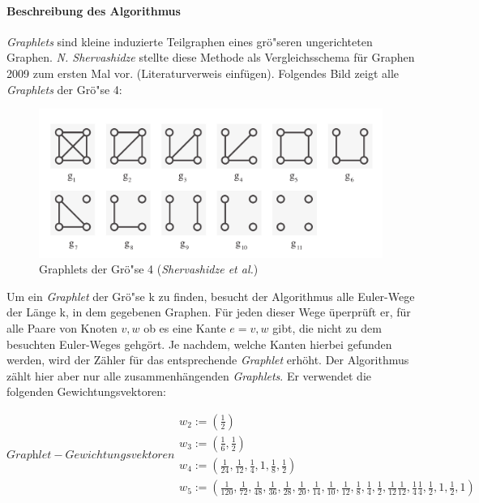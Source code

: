 \documentclass{report}
\begin{document}
\paragraph{Beschreibung des Algorithmus}
\textit{Graphlets} sind kleine induzierte Teilgraphen eines gr\"o"seren ungerichteten Graphen. \textit{N. Shervashidze} stellte diese Methode als Vergleichsschema f\"ur Graphen 2009 zum ersten Mal vor.  (Literaturverweis einf\"ugen). Folgendes Bild zeigt alle \textit{Graphlets} der Gr\"o"se 4:

\begin{figure}[h]
\includegraphics[width =\linewidth]{4graphlets.pdf}
\caption{Graphlets der Gr\"o"se 4 (\textit{Shervashidze et al.})}
\label{fig:4graphlets}
\end{figure}


Um ein \textit{Graphlet} der Gr\"o"se k zu finden, besucht der Algorithmus alle Euler-Wege der L\"ange k, in dem gegebenen Graphen. F\"ur jeden dieser Wege \"uperpr\"uft er, f\"ur alle Paare von Knoten $v,w$ ob es eine Kante $e = {v,w}$ gibt, die nicht zu dem besuchten Euler-Weges gehg\"ort. Je nachdem, welche Kanten hierbei gefunden werden, wird der Z\"ahler f\"ur das entsprechende \textit{Graphlet} erh\"oht. Der Algorithmus z\"ahlt hier aber nur alle zusammenh\"angenden \textit{Graphlets}. Er verwendet die folgenden Gewichtungsvektoren: 


\begin{subequations}
\label{eq:w-vector}
\textit{Graphlet}-Gewichtungsvektoren
\begin{align}
w_2 := \left( \frac{1}{2} \right) \\
w_3 := \left( \frac{1}{6}, \frac{1}{2} \right) \\
w_4 := \left( \frac{1}{24}, \frac{1}{12}, \frac{1}{4}, 1, \frac{1}{8},\frac{1}{2} \right) \\
w_5 := \left( \frac{1}{120}, \frac{1}{72}, \frac{1}{48}, \frac{1}{36}, \frac{1}{28}, \frac{1}{20}, \frac{1}{14}, \frac{1}{10}, \frac{1}{12}, \frac{1}{8}, \frac{1}{4}, \frac{1}{2}, \frac{1}{12} \frac{1}{12}, \frac{1}{4} \frac{1}{4}, \frac{1}{2}, 1, \frac{1}{2}, 1\right)
\end{align}
\end{subequations}
\end{document}
